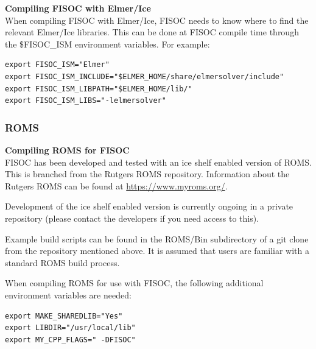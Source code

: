 \documentclass[11pt]{article}
\begin{document}
\vspace{10pt}

\textbf{Compiling FISOC with Elmer/Ice}\\
When compiling FISOC with Elmer/Ice, FISOC needs to know where to 
find the relevant Elmer/Ice libraries.  
This can be done at FISOC compile time through the 
\$FISOC\_ISM
environment variables.  For example:

\begin{lstlisting}
export FISOC_ISM="Elmer"
export FISOC_ISM_INCLUDE="$ELMER_HOME/share/elmersolver/include"
export FISOC_ISM_LIBPATH="$ELMER_HOME/lib/"
export FISOC_ISM_LIBS="-lelmersolver"
\end{lstlisting}





\subsubsection{ROMS}
\label{sec:PreReqROMS}

\textbf{Compiling ROMS for FISOC} \\
FISOC has been developed and tested with an ice shelf enabled version of ROMS. 
This is branched from the Rutgers ROMS repository.  Information about the Rutgers ROMS 
can be found at \url{https://www.myroms.org/}.

Development of the ice shelf enabled version  is currently ongoing 
in a private repository 
(please contact the developers if you need access to this).

Example build scripts can be found in the ROMS/Bin subdirectory of a git clone 
from the repository mentioned above.
It is assumed that users are familiar with a standard ROMS build process. 


When compiling ROMS for use with FISOC, the following additional environment
variables are needed:
\begin{lstlisting}
export MAKE_SHAREDLIB="Yes"
export LIBDIR="/usr/local/lib"
export MY_CPP_FLAGS=" -DFISOC"
\end{lstlisting}
\end{document}
